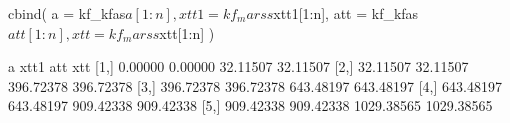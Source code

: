 \begin{Schunk}
\begin{Sinput}
 cbind(
   a = kf_kfas$a[1:n], xtt1 = kf_marss$xtt1[1:n],
   att = kf_kfas$att[1:n], xtt = kf_marss$xtt[1:n]
 )
\end{Sinput}
\begin{Soutput}
             a      xtt1        att        xtt
[1,]   0.00000   0.00000   32.11507   32.11507
[2,]  32.11507  32.11507  396.72378  396.72378
[3,] 396.72378 396.72378  643.48197  643.48197
[4,] 643.48197 643.48197  909.42338  909.42338
[5,] 909.42338 909.42338 1029.38565 1029.38565
\end{Soutput}
\end{Schunk}
